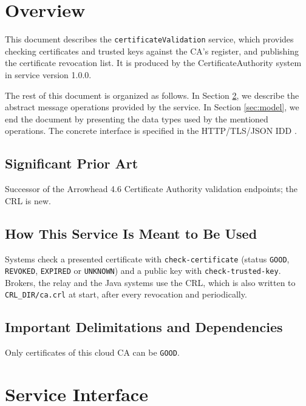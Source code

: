 \documentclass[a4paper]{arrowhead}
\begin{document}
\section{Overview}
\label{sec:overview}

This document describes the \texttt{certificate\allowbreak{}Validation} service, which provides checking certificates and trusted keys against the CA's register, and publishing the certificate revocation list.
It is produced by the CertificateAuthority system \cite{cau-sysd} in service version 1.0.0.

The rest of this document is organized as follows.
In Section \ref{sec:operations}, we describe the abstract message operations provided by the service.
In Section \ref{sec:model}, we end the document by presenting the data types used by the mentioned operations.
The concrete interface is specified in the HTTP/TLS/JSON IDD \cite{cau-certificateValidation-http-idd}.

\subsection{Significant Prior Art}

Successor of the Arrowhead 4.6 Certificate Authority validation endpoints; the CRL is new.

\subsection{How This Service Is Meant to Be Used}

Systems check a presented certificate with \texttt{check-\allowbreak{}certificate} (status \texttt{GOOD}, \texttt{REVOKED}, \texttt{EXPIRED} or \texttt{UNKNOWN}) and a public key with \texttt{check-\allowbreak{}trusted-\allowbreak{}key}. Brokers, the relay and the Java systems use the CRL, which is also written to \texttt{CRL\_\allowbreak{}DIR/\allowbreak{}ca.\allowbreak{}crl} at start, after every revocation and periodically.

\subsection{Important Delimitations and Dependencies}
\label{sec:delimitations}

Only certificates of this cloud CA can be \texttt{GOOD}.

\newpage

\section{Service Interface}
\label{sec:operations}
\end{document}
